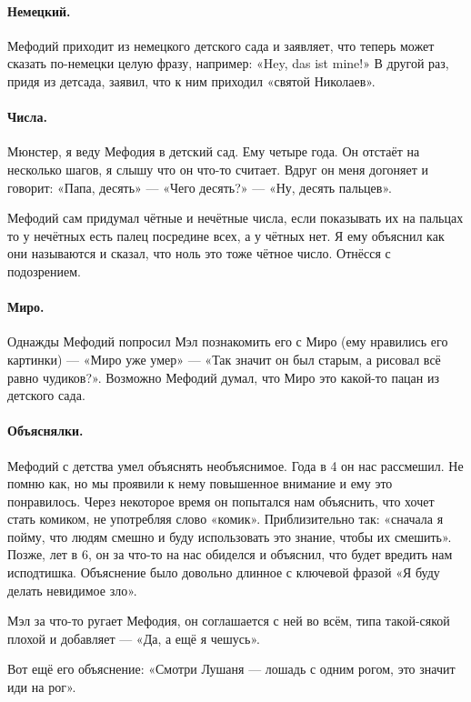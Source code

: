 \documentclass{book}
\begin{document}
\paragraph{Немецкий.} Мефодий приходит из немецкого детского сада
и заявляет, что теперь может сказать по-немецки целую фразу,
например: «Hey, das ist mine!»
В другой раз, придя из детсада, заявил, что к ним приходил «святой Николаев».

\paragraph{Числа.} Мюнстер, я веду Мефодия в детский сад.
Ему четыре года.
Он отстаёт на несколько шагов, 
я слышу что он что-то считает.
Вдруг он меня догоняет и говорит:
«Папа, десять» --- «Чего десять?» --- «Ну, десять пальцев».

Мефодий сам придумал чётные и нечётные числа, если показывать их на пальцах то у нечётных есть палец посредине всех, а у чётных нет.
Я ему объяснил как они называются и сказал, что ноль это тоже чётное число.
Отнёсся с подозрением.

\paragraph{Миро.} Однажды Мефодий попросил Мэл познакомить его с Миро (ему нравились его картинки) --- «Миро уже умер» --- «Так значит он был старым, а рисовал всё равно чудиков?».
Возможно Мефодий думал, что Миро это какой-то пацан из детского сада.


\paragraph{Объяснялки.} Мефодий с детства умел объяснять необъяснимое. 
Года в 4 он нас рассмешил.
Не помню как, но мы проявили к нему повышенное внимание и ему это понравилось.
Через некоторое время он попытался нам объяснить, что хочет стать комиком, не употребляя слово «комик».
Приблизительно так: «сначала я пойму, что людям смешно и буду использовать это знание, чтобы их смешить».
Позже, лет в 6, он за что-то на нас обиделся и объяснил, что будет вредить нам исподтишка.
Объяснение было довольно длинное с ключевой фразой «Я буду делать невидимое зло».

Мэл за что-то ругает Мефодия, он соглашается с ней во всём, типа такой-сякой плохой и добавляет --- «Да, а ещё я чешусь».

Вот ещё его объяснение: «Смотри Лушаня --- лошадь с одним рогом, это значит иди на рог».
\end{document}
